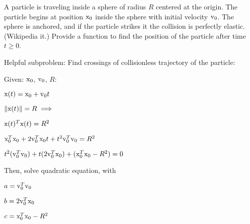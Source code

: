 \documentclass{article}
\begin{document}
\newcommand{\location}{\mathbf{\rm x}}
\newcommand{\loc}{\location}
\newcommand{\velocity}{\mathbf{\rm v}}
\newcommand{\vel}{\velocity}

\newcommand{\sphereradius}{R}

\newcommand{\norm}[1]{\left\lVert#1\right\rVert}

A particle is traveling inside a sphere of radius $\sphereradius$ centered at the origin.
The particle begins at position $\location_0$ inside the sphere with initial velocity $\velocity_0$.
The sphere is anchored, and if the particle strikes it the collision is perfectly elastic. (Wikipedia it.)
Provide a function to find the position of the particle after time $t \geq 0$.

Helpful subproblem:  Find crossings of collisionless trajectory of the particle:

Given: $\loc_0$, $\vel_0$, $\sphereradius$:

$\location(t) = \location_0 + \velocity_0 t$

$\norm{\location(t)} = \sphereradius \implies$

$\location(t)^T \location(t) = \sphereradius^2$

$\loc_0^T \loc_0 + 2 \vel_0^T \loc_0 t + t^2 \vel_0^T \vel_0 = \sphereradius^2$

$t^2 (\vel_0^T \vel_0 ) + t ( 2 \vel_0^T \loc_0 ) + ( \loc_0^T \loc_0 - \sphereradius^2 ) = 0$

Then, solve quadratic equation, with

$a = \vel_0^T \vel_0$

$b = 2 \vel_0^T \loc_0$

$c = \loc_0^T \loc_0 - \sphereradius^2$
\end{document}

